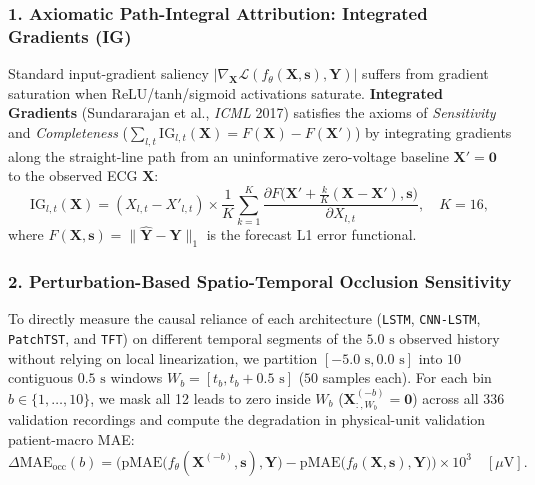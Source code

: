 \documentclass[11pt,a4paper]{article}
\begin{document}
\subsubsection{1. Axiomatic Path-Integral Attribution: Integrated Gradients (IG)}
Standard input-gradient saliency $|\nabla_{\mathbf{X}} \mathcal{L}(f_\theta(\mathbf{X}, \mathbf{s}), \mathbf{Y})|$ suffers from gradient saturation when ReLU/tanh/sigmoid activations saturate. \textbf{Integrated Gradients} (Sundararajan et al., \emph{ICML} 2017) satisfies the axioms of \emph{Sensitivity} and \emph{Completeness} ($\sum_{l,t} \text{IG}_{l,t}(\mathbf{X}) = F(\mathbf{X}) - F(\mathbf{X}')$) by integrating gradients along the straight-line path from an uninformative zero-voltage baseline $\mathbf{X}' = \mathbf{0}$ to the observed ECG $\mathbf{X}$:
\begin{equation}
    \text{IG}_{l,t}(\mathbf{X}) = (X_{l,t} - X'_{l,t}) \times \frac{1}{K} \sum_{k=1}^{K} \frac{\partial F\big(\mathbf{X}' + \frac{k}{K}(\mathbf{X} - \mathbf{X}'), \mathbf{s}\big)}{\partial X_{l,t}}, \quad K = 16,
\end{equation}
where $F(\mathbf{X}, \mathbf{s}) = \|\hat{\mathbf{Y}} - \mathbf{Y}\|_1$ is the forecast L1 error functional.

\subsubsection{2. Perturbation-Based Spatio-Temporal Occlusion Sensitivity}
To directly measure the causal reliance of each architecture (\texttt{LSTM}, \texttt{CNN-LSTM}, \texttt{PatchTST}, and \texttt{TFT}) on different temporal segments of the $5.0\text{ s}$ observed history without relying on local linearization, we partition $[-5.0\text{ s}, 0.0\text{ s}]$ into $10$ contiguous $0.5\text{ s}$ windows $W_b = [t_b, t_b + 0.5\text{ s}]$ ($50$ samples each). For each bin $b \in \{1,\dots,10\}$, we mask all 12 leads to zero inside $W_b$ ($\mathbf{X}^{(-b)}_{:, W_b} = \mathbf{0}$) across all $336$ validation recordings and compute the degradation in physical-unit validation patient-macro MAE:
\begin{equation}
    \Delta \text{MAE}_{\text{occ}}(b) = \Big(\text{pMAE}\big(f_\theta(\mathbf{X}^{(-b)}, \mathbf{s}), \mathbf{Y}\big) - \text{pMAE}\big(f_\theta(\mathbf{X}, \mathbf{s}), \mathbf{Y}\big)\Big) \times 10^3 \quad [\mu\text{V}].
\end{equation}
\end{document}
